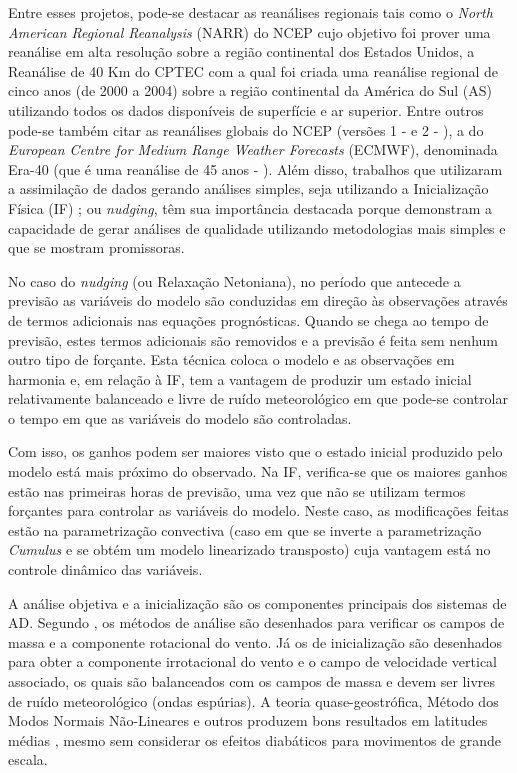 Entre esses projetos, pode-se destacar as reanálises regionais tais como o \textit{North American Regional Reanalysis} (NARR) do NCEP \cite{messingeretal06} cujo objetivo foi prover uma reanálise em alta resolução sobre a região continental dos Estados Unidos, a Reanálise de 40 Km do CPTEC \cite{aravequiaetal07} com a qual foi criada uma reanálise regional de cinco anos (de 2000 a 2004) sobre a região continental da América do Sul (AS) utilizando todos os dados disponíveis de superfície e ar superior. Entre outros pode-se também citar as reanálises globais do NCEP (versões 1 -  e 2 - ), a do \textit{European Centre for Medium Range Weather Forecasts} (ECMWF), denominada Era-40 (que é uma reanálise de 45 anos - ). Além disso, trabalhos que utilizaram a assimilação de dados gerando análises simples, seja utilizando a Inicialização Física (IF) \cite{nunescocke04}; \cite{biazettoetal05} ou \textit{nudging}, têm sua importância destacada porque demonstram a capacidade de gerar análises de qualidade utilizando metodologias mais simples e que se mostram promissoras. 

No caso do \textit{nudging} (ou Relaxação Netoniana), no período que antecede a previsão as variáveis do modelo são conduzidas em direção às observações através de termos adicionais nas equações prognósticas. Quando se chega ao tempo de previsão, estes termos adicionais são removidos e a previsão é feita sem nenhum outro tipo de forçante. Esta técnica coloca o modelo e as observações em harmonia e, em relação à IF, tem a vantagem de produzir um estado inicial relativamente balanceado e livre de ruído meteorológico em que pode-se controlar o tempo em que as variáveis do modelo são controladas. 

Com isso, os ganhos podem ser maiores visto que o estado inicial produzido pelo modelo está mais próximo do observado. Na IF, verifica-se que os maiores ganhos estão nas primeiras horas de previsão, uma vez que não se utilizam termos forçantes para controlar as variáveis do modelo. Neste caso, as modificações feitas estão na parametrização convectiva (caso em que se inverte a parametrização \textit{Cumulus} e se obtém um modelo linearizado transposto) cuja vantagem está no controle dinâmico das variáveis.

A análise objetiva e a inicialização são os componentes principais dos sistemas de AD. Segundo , os métodos de análise são desenhados para verificar os campos de massa e a componente rotacional do vento. Já os de inicialização são desenhados para obter a componente irrotacional do vento e o campo de velocidade vertical associado, os quais são balanceados com os campos de massa e devem ser livres de ruído meteorológico (ondas espúrias). A teoria quase-geostrófica, Método dos Modos Normais Não-Lineares e outros produzem bons resultados em latitudes médias \cite{krishnamurtietal91}, mesmo sem considerar os efeitos diabáticos para movimentos de grande escala. 

